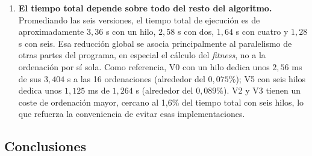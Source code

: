 \documentclass[12pt]{article}
\begin{document}
\begin{enumerate}
\begin{enumerate}
    \item \textbf{El tiempo total depende sobre todo del resto del algoritmo.} Promediando las seis versiones, el tiempo total de ejecución es de aproximadamente $3,36$ s con un hilo, $2,58$ s con dos, $1,64$ s con cuatro y $1,28$ s con seis. Esa reducción global se asocia principalmente al paralelismo de otras partes del programa, en especial el cálculo del \textit{fitness}, no a la ordenación por sí sola. Como referencia, V0 con un hilo dedica unos $2,56$ ms de sus $3,404$ s a las 16 ordenaciones (alrededor del $0,075\%$); V5 con seis hilos dedica unos $1,125$ ms de $1,264$ s (alrededor del $0,089\%$). V2 y V3 tienen un coste de ordenación mayor, cercano al 1,6\% del tiempo total con seis hilos, lo que refuerza la conveniencia de evitar esas implementaciones.
\end{enumerate}
 
\subsection*{Conclusiones}
 

\end{enumerate}
\end{document}
